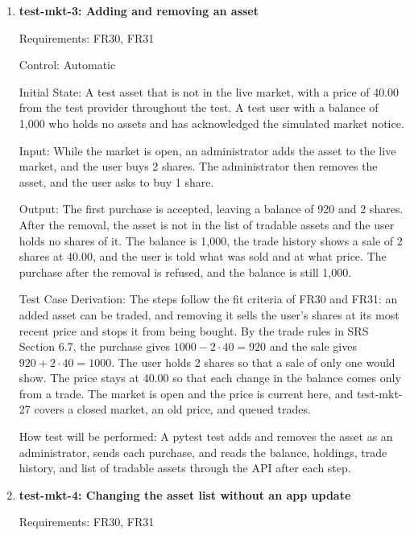 \documentclass[12pt, titlepage]{article}
\begin{document}
\begin{enumerate}
How test will be performed: A pytest test sets the test provider's prices,
adds the assets as an administrator, reads the list of tradable assets through
the API, sends each purchase, and checks which are accepted.

\item{\textbf{test-mkt-3: Adding and removing an asset}\\}

Requirements: FR30, FR31

Control: Automatic

Initial State: A test asset that is not in the live market, with a price of
40.00 from the test provider throughout the test. A test user with a balance
of 1,000 who holds no assets and has acknowledged the simulated market notice.

Input: While the market is open, an administrator adds the asset to the live
market, and the user buys 2 shares. The administrator then removes the asset,
and the user asks to buy 1 share.

Output: The first purchase is accepted, leaving a balance of 920 and 2 shares.
After the removal, the asset is not in the list of tradable assets and the
user holds no shares of it. The balance is 1,000, the trade history shows a
sale of 2 shares at 40.00, and the user is told what was sold and at what
price. The purchase after the removal is refused, and the balance is still
1,000.

Test Case Derivation: The steps follow the fit criteria of FR30 and FR31: an
added asset can be traded, and removing it sells the user's shares at its most
recent price and stops it from being bought. By the trade rules in SRS Section
6.7, the purchase gives $1000 - 2 \cdot 40 = 920$ and the sale gives
$920 + 2 \cdot 40 = 1000$. The user holds 2 shares so that a sale of only one
would show. The price stays at 40.00 so that each change in the balance comes
only from a trade. The market is open and the price is current here, and
test-mkt-27 covers a closed market, an old price, and queued trades.

How test will be performed: A pytest test adds and removes the asset as an
administrator, sends each purchase, and reads the balance, holdings, trade
history, and list of tradable assets through the API after each step.

\item{\textbf{test-mkt-4: Changing the asset list without an app update}\\}

Requirements: FR30, FR31


\end{enumerate}
\end{document}
